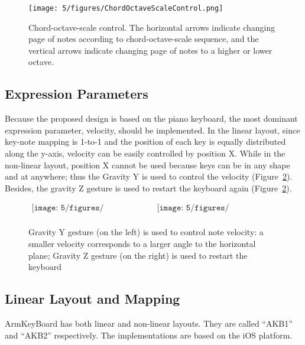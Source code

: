 \begin{figure}[htbp]
\centering
\texttt{[image: 5/figures/ChordOctaveScaleControl.png]}
\caption{Chord-octave-scale control. The horizontal arrows indicate changing page of notes according to chord-octave-scale sequence, and the vertical arrows indicate changing page of notes to a higher or lower octave.}
\label{5-figChordOctaveScaleControl}
\end{figure}

\subsection{Expression Parameters}
Because the proposed design is based on the piano keyboard, the most dominant expression parameter, velocity, should be implemented. In the
linear layout, since key-note mapping is 1-to-1 and the position of each key is equally distributed along the y-axis, velocity can be easily controlled by position X. While in the non-linear layout, position X cannot be used because keys can be in any shape and at anywhere; thus the Gravity Y is used to control the velocity (Figure~\ref{fig:5-GravityYZGesture}). Besides, the gravity Z gesture is used to restart the keyboard again (Figure~\ref{fig:5-GravityYZGesture}).
\begin{figure}[htbp]
\begin{center}$
\begin{array}{cc}
\texttt{[image: 5/figures/GravityY.jpg]} &
\texttt{[image: 5/figures/GravityZ.jpg]} \\
\end{array}$
\end{center}
\caption{Gravity Y gesture (on the left) is used to control note velocity: a smaller velocity corresponds to a larger angle to the horizontal plane; Gravity Z gesture (on the right) is used to restart the keyboard}
\label{fig:5-GravityYZGesture}
\end{figure}

\subsection{Linear Layout and Mapping}
ArmKeyBoard has both linear and non-linear layouts. They are called ``AKB1'' and ``AKB2'' respectively. The implementations are based on the iOS platform.

